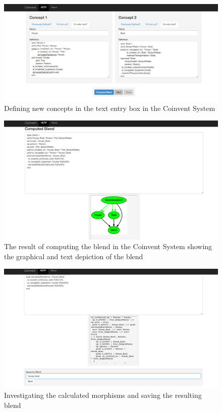 \begin{figure}[!h]
\begin{center}
\includegraphics[width=\textwidth]{ss3.png}
\end{center}
\label{fig:ss3}
\caption{Defining new concepts in the text entry box in the Coinvent System}
\end{figure}

\begin{figure}[!h]
\begin{center}
\includegraphics[width=\textwidth]{ss4.png}
\end{center}
\label{fig:ss4}
\caption{The result of computing the blend in the Coinvent System showing the graphical and text depiction of the blend}
\end{figure}

\begin{figure}[!h]
\begin{center}
\includegraphics[width=\textwidth]{ss5.png}
\end{center}
\label{fig:ss5}
\caption{Investigating the calculated morphisms and saving the resulting blend}
\end{figure}

